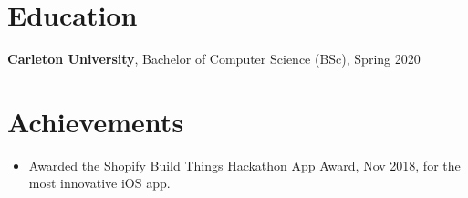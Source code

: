 \section*{Education}
\textbf{Carleton University}, Bachelor of Computer Science (BSc), Spring 2020

\section*{Achievements}
\begin{itemize}
    \setlength\itemsep{0em}
    \item Awarded the Shopify Build Things Hackathon App Award, Nov 2018, for the most innovative iOS app.
\end{itemize}


